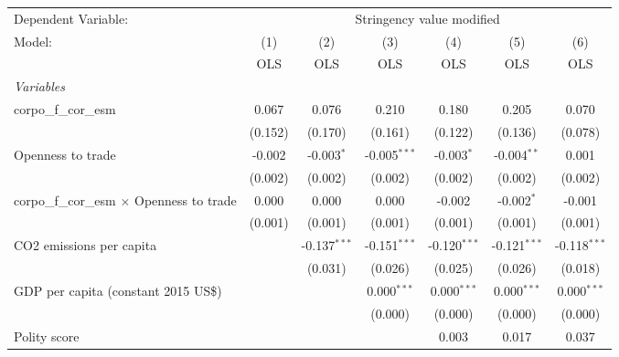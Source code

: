 
\begingroup
\centering
\begin{tabular}{lcccccc}
   \toprule
   Dependent Variable: & \multicolumn{6}{c}{Stringency value modified}\\
   Model:                                            & (1)     & (2)            & (3)            & (4)            & (5)            & (6)\\  
                                                     &  OLS    & OLS            & OLS            & OLS            & OLS            & OLS\\  
   \midrule
   \emph{Variables}\\
   corpo\_f\_cor\_esm                                & 0.067   & 0.076          & 0.210          & 0.180          & 0.205          & 0.070\\   
                                                     & (0.152) & (0.170)        & (0.161)        & (0.122)        & (0.136)        & (0.078)\\   
   Openness to trade                                 & -0.002  & -0.003$^{*}$   & -0.005$^{***}$ & -0.003$^{*}$   & -0.004$^{**}$  & 0.001\\   
                                                     & (0.002) & (0.002)        & (0.002)        & (0.002)        & (0.002)        & (0.002)\\   
   corpo\_f\_cor\_esm $\times$ Openness to trade     & 0.000   & 0.000          & 0.000          & -0.002         & -0.002$^{*}$   & -0.001\\   
                                                     & (0.001) & (0.001)        & (0.001)        & (0.001)        & (0.001)        & (0.001)\\   
   CO2 emissions per capita                          &         & -0.137$^{***}$ & -0.151$^{***}$ & -0.120$^{***}$ & -0.121$^{***}$ & -0.118$^{***}$\\   
                                                     &         & (0.031)        & (0.026)        & (0.025)        & (0.026)        & (0.018)\\   
   GDP per capita (constant 2015 US\$)               &         &                & 0.000$^{***}$  & 0.000$^{***}$  & 0.000$^{***}$  & 0.000$^{***}$\\   
                                                     &         &                & (0.000)        & (0.000)        & (0.000)        & (0.000)\\   
   Polity score                                      &         &                &                & 0.003          & 0.017          & 0.037\\   

\end{tabular}
